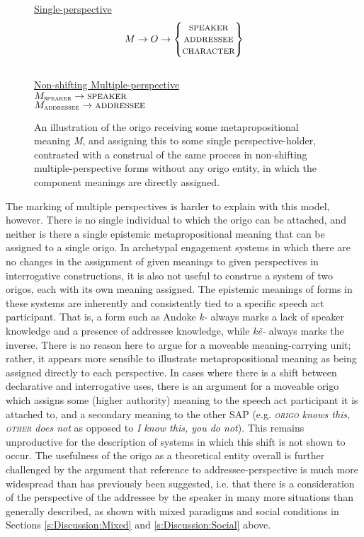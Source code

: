    \begin{figure}
        \centering
\underline{Single-perspective}
\[M \rightarrow O \rightarrow \begin{Bmatrix}
    \textsc{speaker} \\ 
    \textsc{addressee} \\ 
    \textsc{character}
\end{Bmatrix}\] \\

\underline{Non-shifting Multiple-perspective} \\
\(M_{\textsc{speaker}} \rightarrow{\textsc{speaker}}\) \\
\(M_{\textsc{addressee}} \rightarrow{\textsc{addressee}}\)
\caption{An illustration of the origo receiving some metapropositional meaning \textit{M}, and assigning this to some single perspective-holder, contrasted with a construal of the same process in non-shifting multiple-perspective forms without any origo entity, in which the component meanings are directly assigned.}\label{f:Discussion:Origo}
    \end{figure}

The marking of multiple perspectives is harder to explain with this model, however. There is no single individual to which the origo can be attached, and neither is there a single epistemic metapropositional meaning that can be assigned to a single origo. In archetypal engagement systems in which there are no changes in the assignment of given meanings to given perspectives in interrogative constructions, it is also not useful to construe a system of two origos, each with its own meaning assigned. The epistemic meanings of forms in these systems are inherently and consistently tied to a specific speech act participant. That is, a form such as Andoke \cite[Isolate: Colombia,][117]{EvansBergqvistSanRoque2018a} \textit{k-} always marks a lack of speaker knowledge and a presence of addressee knowledge, while \textit{kẽ-} always marks the inverse. There is no reason here to argue for a moveable meaning-carrying unit; rather, it appears more sensible to illustrate metapropositional meaning as being assigned directly to each perspective. In cases where there is a shift between declarative and interrogative uses, there is an argument for a moveable origo which assigns some (higher authority) meaning to the speech act participant it is attached to, and a secondary meaning to the other SAP (e.g. \textit{\textsc{origo} knows this, \textsc{other} does not} as opposed to \textit{I know this, you do not}). This remains unproductive for the description of systems in which this shift is not shown to occur. The usefulness of the origo as a theoretical entity overall is further challenged by the argument that reference to addressee-perspective is much more widespread than has previously been suggested, i.e. that there is a consideration of the perspective of the addressee by the speaker in many more situations than generally described, as shown with mixed paradigms and social conditions in Sections \ref{s:Discussion:Mixed} and \ref{s:Discussion:Social} above.

